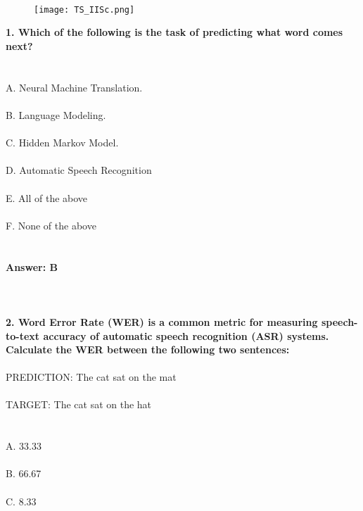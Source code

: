 \documentclass[prl,twocolumn,showpacs,preprintnumbers,superscriptaddress]{revtex4}
\theoremstyle{plain}
\theoremstyle{definition}
\begin{document}
\begin{widetext}
\\
\\
\\

\begin{wrapfigure}
\centering
\end{wrapfigure}
\begin{figure}[h!]
 \begin{right}
  \hfill\texttt{[image: TS\_IISc.png]}
 \end{right}
\end{figure}
\noindent\textbf{1. Which of the following is the task of predicting what word comes next?}
\\
\\
\\
A. Neural Machine Translation.
\\
\\
B. Language Modeling.
\\
\\
C. Hidden Markov Model.
\\
\\
D. Automatic Speech Recognition
\\
\\
E. All of the above
\\
\\
F. None of the above
\\
\\
\\
\textbf{Answer: B}
\\
\\
\\
\\
\textbf{2. Word Error Rate (WER) is a common metric for measuring speech-to-text accuracy of automatic speech recognition (ASR) systems. Calculate the WER between the following two sentences:}
\\
\\
PREDICTION: The cat sat on the mat
\\
\\
TARGET: The cat sat on the hat
\\
\\
\\
\noindent A. 33.33%
\\
\\
B. 66.67%
\\
\\
C. 8.33%
\\

\end{widetext}
\end{document}
